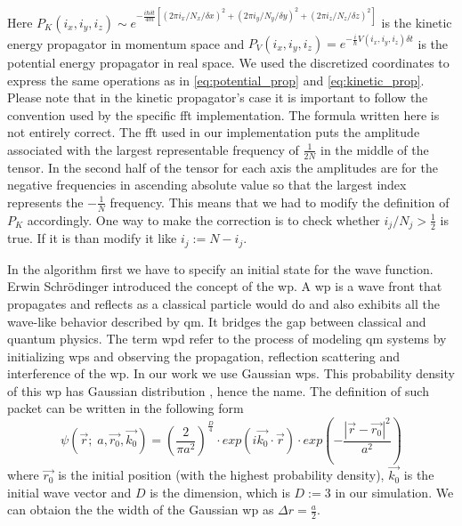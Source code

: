 Here $P_K(i_x, i_y, i_z) \sim e^{-\frac{i \hbar \delta t}{4m} \left[(2\pi i_x / N_x / \delta x)^2 + (2\pi i_y / N_y /\delta y)^2 + (2\pi i_z / N_z / \delta z)^2\right]}$ is the kinetic energy propagator in momentum space and $P_V(i_x, i_y, i_z) = e^{-\frac{i}{\hbar}V(i_x, i_y, i_z)\delta t}$ is the potential energy propagator in real space.
We used the discretized coordinates to express the same operations as in \ref{eq:potential_prop} and \ref{eq:kinetic_prop}.
Please note that in the kinetic propagator's case it is important to follow the convention used by the specific \acrshort{fft} implementation.
The formula written here is not entirely correct.
The \acrshort{fft} used in our implementation puts the amplitude associated with the largest representable frequency of $\frac{1}{2N}$ in the middle of the tensor.
In the second half of the tensor for each axis the amplitudes are for the negative frequencies in ascending absolute value so that the largest index represents the $-\frac{1}{N}$ frequency.
This means that we had to modify the definition of $P_K$ accordingly.
One way to make the correction is to check whether $i_j / N_j > \frac{1}{2}$ is true. If it is than modify it like $i_j := N - i_j$.

In the algorithm first we have to specify an initial state for the wave function.
Erwin Schrödinger introduced the concept of the \acrfull{wp}.
A \acrshort{wp} is a wave front that propagates and reflects as a classical particle would do
and also exhibits all the wave-like behavior described by \acrshort{qm}.
It bridges the gap between classical and quantum physics.
The term \acrfull{wpd} refer to the process of modeling \acrshort{qm} systems by initializing \acrshort{wp}s
and observing the propagation, reflection scattering and interference of the \acrshort{wp}.
In our work we use Gaussian \acrshort{wp}s.
This probability density of this \acrshort{wp} has Gaussian distribution \cite{Zhang2010}, hence the name.
The definition of such packet can be written in the following form
\begin{equation}
	\label{eq:gaussiaon_wp}
	\psi(\vec{r};\; a, \vec{r_0}, \vec{k_0}) = \left( \frac{2}{\pi a^2} \right)^{\frac{D}{4}} \cdot exp\left( i\vec{k_0} \cdot \vec{r} \right) \cdot exp \left( -\frac{|\vec{r} - \vec{r_0}|^2}{a^2} \right)
\end{equation}
where $\vec{r_0}$ is the initial position (with the highest probability density), $\vec{k_0}$ is the initial wave vector and $D$ is the dimension, which is  $D:=3$ in our simulation.
We can obtaion the the width of the Gaussian \acrshort{wp} as $\Delta r = \frac{a}{2}$.


